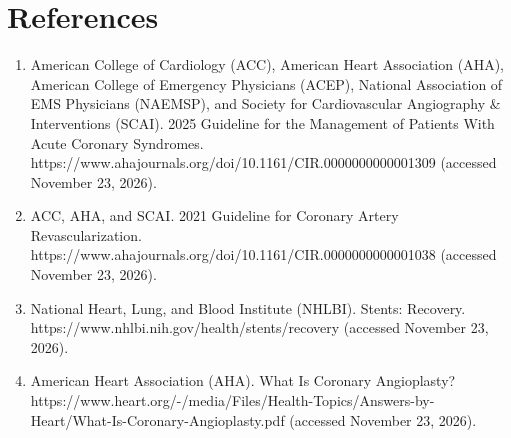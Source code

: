 \section*{References}
\begin{enumerate}
  \item American College of Cardiology (ACC), American Heart Association (AHA), American College of Emergency Physicians (ACEP), National Association of EMS Physicians (NAEMSP), and Society for Cardiovascular Angiography \& Interventions (SCAI). 2025 Guideline for the Management of Patients With Acute Coronary Syndromes. https://www.ahajournals.org/doi/10.1161/CIR.0000000000001309 (accessed November 23, 2026).
  \item ACC, AHA, and SCAI. 2021 Guideline for Coronary Artery Revascularization. https://www.ahajournals.org/doi/10.1161/CIR.0000000000001038 (accessed November 23, 2026).
  \item National Heart, Lung, and Blood Institute (NHLBI). Stents: Recovery. https://www.nhlbi.nih.gov/health/stents/recovery (accessed November 23, 2026).
  \item American Heart Association (AHA). What Is Coronary Angioplasty? https://www.heart.org/-/media/Files/Health-Topics/Answers-by-Heart/What-Is-Coronary-Angioplasty.pdf (accessed November 23, 2026).
\end{enumerate}
\clearpage
